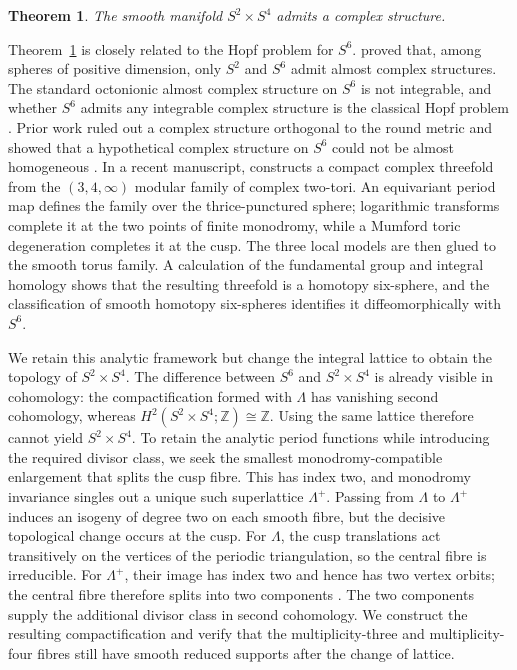 \documentclass[11pt]{article}
\newtheorem{theorem}{Theorem}[section]
\theoremstyle{definition}
\theoremstyle{remark}
\numberwithin{equation}{section}
\begin{document}
\begin{theorem}\label{thm:main}
The smooth manifold $S^2\times S^4$ admits a complex structure.
\end{theorem}

Theorem~\ref{thm:main} is closely related to the Hopf problem for $S^6$.
\citet{BorelSerre1953} proved that, among spheres of positive dimension, only
$S^2$ and $S^6$ admit almost complex structures.  The standard octonionic almost complex structure on
$S^6$ is not integrable, and whether $S^6$ admits any integrable complex
structure is the classical Hopf problem
\citep{Hopf1948,Yau1992,AgricolaEtAl2018}.  Prior work ruled out a complex
structure orthogonal to the round metric \citep{LeBrun1987} and showed that a
hypothetical complex structure on $S^6$ could not be almost homogeneous
\citep{HuckleberryEtAl2000}.  In a recent manuscript,
\citet{Alpoge2026} constructs a compact complex threefold from the
$(3,4,\infty)$ modular family of complex two-tori.  An equivariant period
map defines the family over the thrice-punctured sphere; logarithmic
transforms complete it at the two points of finite monodromy, while a
Mumford toric degeneration completes it at the cusp.  The three local models
are then glued to the smooth torus family.  A calculation of the fundamental
group and integral homology shows that the resulting threefold is a homotopy
six-sphere, and the classification of smooth homotopy six-spheres identifies
it diffeomorphically with $S^6$.

We retain this analytic framework but change the integral lattice to obtain
the topology of $S^2\times S^4$.  The
difference between $S^6$ and $S^2\times S^4$ is already visible in cohomology: the compactification formed
with $\Lambda$ has vanishing second cohomology, whereas
$H^2(S^2\times S^4;\mathbb Z)\cong\mathbb Z$.  Using the same lattice
therefore cannot yield $S^2\times S^4$.  To retain the analytic period functions
while introducing the required divisor class, we seek the smallest
monodromy-compatible enlargement that splits the cusp fibre.  This has index
two, and monodromy invariance singles out a unique such superlattice
$\Lambda^+$.  Passing from $\Lambda$ to $\Lambda^+$ induces an isogeny
of degree two on each smooth fibre, but the decisive topological change
occurs at the cusp.  For
$\Lambda$, the cusp translations act transitively on the vertices of the
periodic triangulation, so the central fibre is irreducible.  For
$\Lambda^+$, their image has index two and hence has two vertex orbits; the
central fibre therefore splits into two components
\citep[Remark~4.9]{Alpoge2026}.  The two components supply the additional
divisor class in second cohomology.  We construct the resulting
compactification and verify
that the multiplicity-three and multiplicity-four fibres still have smooth
reduced supports after the change of lattice.
\end{document}
